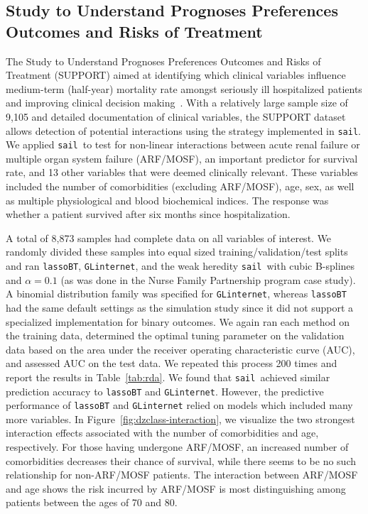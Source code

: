 \documentclass[useAMS,usenatbib,referee]{biom}
\newcommand{\sail}{\texttt{sail}}
\begin{document}
\subsection{Study to Understand Prognoses Preferences Outcomes and Risks of Treatment}

The Study to Understand Prognoses Preferences Outcomes and Risks of Treatment (SUPPORT) aimed at identifying which clinical variables influence medium-term (half-year) mortality rate amongst seriously ill hospitalized patients and improving clinical decision making~\citep{connors1995controlled}. 
With a relatively large sample size of 9,105 and detailed documentation of clinical variables, the SUPPORT dataset allows detection of potential interactions using the strategy implemented in \sail. 
We applied \sail ~to test for non-linear interactions between acute renal failure or multiple organ system failure (ARF/MOSF), an important predictor for survival rate, and 13 other variables that were deemed clinically relevant. 
These variables included the number of comorbidities (excluding ARF/MOSF), age, sex, as well as multiple physiological and blood biochemical indices. 
The response was whether a patient survived after six months since hospitalization.

A total of 8,873 samples had complete data on all variables of interest. 
We randomly divided these samples into equal sized training/validation/test splits and ran \texttt{lassoBT}, \texttt{GLinternet}, and the weak heredity \sail ~with cubic B-splines and $\alpha=0.1$ (as was done in the Nurse Family Partnership program case study). 
A binomial distribution family was specified for \texttt{GLinternet}, whereas \texttt{lassoBT} had the same default settings as the simulation study since it did not support a specialized implementation for binary outcomes. 
We again ran each method on the training data, determined the optimal tuning parameter on the validation data based on the area under the receiver operating characteristic curve (AUC), and assessed AUC on the test data. 
We repeated this process 200 times and report the results in Table~\ref{tab:rda}.
We found that \sail ~achieved similar prediction accuracy to \texttt{lassoBT} and \texttt{GLinternet}. 
However, the predictive performance of \texttt{lassoBT} and \texttt{GLinternet} relied on models which included many more variables. 
In Figure~\ref{fig:dzclass-interaction}, we visualize the two strongest interaction effects associated with the number of comorbidities and age, respectively. 
For those having undergone ARF/MOSF, an increased number of comorbidities decreases their chance of survival, while there seems to be no such relationship for non-ARF/MOSF patients. 
The interaction between ARF/MOSF and age shows the risk incurred by ARF/MOSF is most distinguishing among patients between the ages of 70 and 80.
\end{document}
